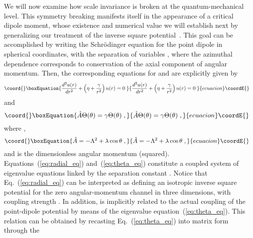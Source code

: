 \documentclass[a4paper,twocolumn,
showpacs,amssymb,aps,prl,superscriptaddress]{revtex4}%
\begin{document}
We will now examine how scale invariance is broken at the
quantum-mechanical level. This symmetry breaking manifests itself
in the appearance of a critical dipole moment, whose existence
and numerical value we will establish next by generalizing our
treatment of the inverse square potential~\cite{cam:00}. This goal can
be accomplished by writing the Schr\"{o}dinger equation for the point
dipole in spherical coordinates, with the separation of variables
 \coordHE{},
where the azimuthal dependence corresponds to conservation of the
axial component \coordHE{} of angular momentum. Then, the
corresponding equations for \coordHE{} and \myHighlight{$\theta$}\coordHE{} are explicitly given
by
\begin{equation}\coord{}\boxEquation{
\frac{d^{2}  u(r)}{dr^{2}} + \left( \eta + \frac{\gamma}{r^{2}}
\right) u(r) = 0 \;
\label{eq:radial_eq}
}{
\frac{d^{2}  u(r)}{dr^{2}} + \left( \eta + \frac{\gamma}{r^{2}}
\right) u(r) = 0 \;
}{ecuacion}\coordE{}\end{equation} 
and
\begin{equation}\coord{}\boxEquation{
\hat{A} \Theta (\theta) = \gamma \Theta (\theta) \; ,
\label{eq:theta_eq}
}{
\hat{A} \Theta (\theta) = \gamma \Theta (\theta) \; ,
}{ecuacion}\coordE{}\end{equation}
where \coordHE{},
\begin{equation}\coord{}\boxEquation{
\hat{A} = - \Lambda^{2} + \lambda \cos \theta
 \; ,
\label{eq:angular_operator} 
}{
\hat{A} = - \Lambda^{2} + \lambda \cos \theta
 \; ,
}{ecuacion}\coordE{}\end{equation}
and
  \coordHE{} is the dimensionless angular momentum (squared).
Equations~(\ref{eq:radial_eq}) and~(\ref{eq:theta_eq}) constitute
a coupled system of eigenvalue equations linked by the separation
constant \myHighlight{$\gamma$}\coordHE{}. Notice that Eq.~(\ref{eq:radial_eq}) can be
interpreted as defining an isotropic inverse square potential for
the zero angular-momentum channel in three dimensions, with
coupling strength \coordHE{}. In addition,
\myHighlight{$\gamma$}\coordHE{} is implicitly related to the actual coupling \myHighlight{$\lambda$}\coordHE{} of
the point-dipole potential by means of the eigenvalue
equation~(\ref{eq:theta_eq}). This relation can be obtained by
recasting Eq.~(\ref{eq:theta_eq}) into matrix form through the
\end{document}
